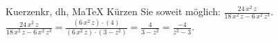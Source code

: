 \begin{MAufgabe}{Kuerzen}{kr, dh, MaTeX}
K\"urzen Sie soweit m\"oglich: $\frac{24\, x^2\, z}{18\, x^2\, z - 6\, x^2\, z^3}$.\\ 
\ifLsg\MLoesung
\quad $\frac{24\, x^2\, z}{18\, x^2\, z - 6\, x^2\, z^3}=\frac{(6\, x^2\, z)\cdot(4)}{(6\, x^2\, z)\cdot(3 - z^2)}=\frac{4}{3 - z^2}=\frac{-4}{z^2 - 3}$.\else\relax\fi
 \end{MAufgabe}